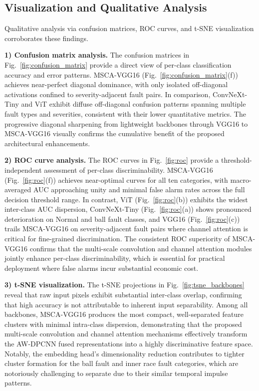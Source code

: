 \documentclass[pdflatex,sn-mathphys-num]{sn-jnl}
\theoremstyle{thmstyleone}%
\theoremstyle{thmstyletwo}%
\theoremstyle{thmstylethree}%
\begin{document}
\subsection{Visualization and Qualitative Analysis}

Qualitative analysis via confusion matrices, ROC curves, and t-SNE visualization corroborates these findings.

\textbf{1) Confusion matrix analysis.} The confusion matrices in Fig.~\ref{fig:confusion_matrix} provide a direct view of per-class classification accuracy and error patterns. MSCA-VGG16 (Fig.~\ref{fig:confusion_matrix}(f)) achieves near-perfect diagonal dominance, with only isolated off-diagonal activations confined to severity-adjacent fault pairs. In comparison, ConvNeXt-Tiny and ViT exhibit diffuse off-diagonal confusion patterns spanning multiple fault types and severities, consistent with their lower quantitative metrics. The progressive diagonal sharpening from lightweight backbones through VGG16 to MSCA-VGG16 visually confirms the cumulative benefit of the proposed architectural enhancements.

\textbf{2) ROC curve analysis.} The ROC curves in Fig.~\ref{fig:roc} provide a threshold-independent assessment of per-class discriminability. MSCA-VGG16 (Fig.~\ref{fig:roc}(f)) achieves near-optimal curves for all ten categories, with macro-averaged AUC approaching unity and minimal false alarm rates across the full decision threshold range. In contrast, ViT (Fig.~\ref{fig:roc}(b)) exhibits the widest inter-class AUC dispersion, ConvNeXt-Tiny (Fig.~\ref{fig:roc}(a)) shows pronounced deterioration on Normal and ball fault classes, and VGG16 (Fig.~\ref{fig:roc}(c)) trails MSCA-VGG16 on severity-adjacent fault pairs where channel attention is critical for fine-grained discrimination. The consistent ROC superiority of MSCA-VGG16 confirms that the multi-scale convolution and channel attention modules jointly enhance per-class discriminability, which is essential for practical deployment where false alarms incur substantial economic cost.

\textbf{3) t-SNE visualization.} The t-SNE projections in Fig.~\ref{fig:tsne_backbones} reveal that raw input pixels exhibit substantial inter-class overlap, confirming that high accuracy is not attributable to inherent input separability. Among all backbones, MSCA-VGG16 produces the most compact, well-separated feature clusters with minimal intra-class dispersion, demonstrating that the proposed multi-scale convolution and channel attention mechanisms effectively transform the AW-DPCNN fused representations into a highly discriminative feature space. Notably, the embedding head's dimensionality reduction contributes to tighter cluster formation for the ball fault and inner race fault categories, which are notoriously challenging to separate due to their similar temporal impulse patterns.
\end{document}
